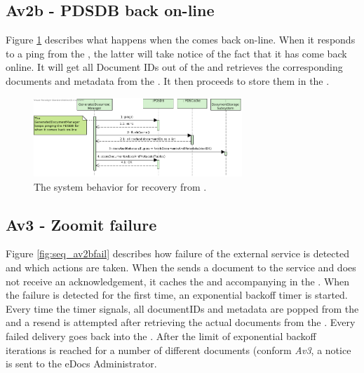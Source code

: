 \subsection{Av2b - PDSDB back on-line}
Figure \ref{fig:seq_av2bonline} describes what happens when the  comes back on-line. When it responds to a ping from the , the latter will take notice of the fact that it has come back online. It will get all Document IDs out of the  and retrieves the corresponding documents and metadata from the . It then proceeds to store them in the .

\begin{figure}[!htp]
    \centering
    \includegraphics[width=0.7\textwidth]{figures/Av2b - PDSDB back on-line.png}
    \caption{The system behavior for recovery from .
        }\label{fig:seq_av2bonline}
\end{figure}


\subsection{Av3 - Zoomit failure}
Figure \ref{fig:seq_av2bfail} describes how failure of the external  service is detected and which actions are taken. When the  sends a document to the  service and does not receive an acknowledgement, it caches the  and accompanying  in the . When the failure is detected for the first time, an exponential backoff timer is started. Every time the timer signals, all documentIDs and metadata are popped from the  and a resend is attempted after retrieving the actual documents from the . Every failed delivery goes back into the . After the limit of exponential backoff iterations is reached for a number of different documents (conform \emph{Av3}, a notice is sent to the eDocs Administrator.

